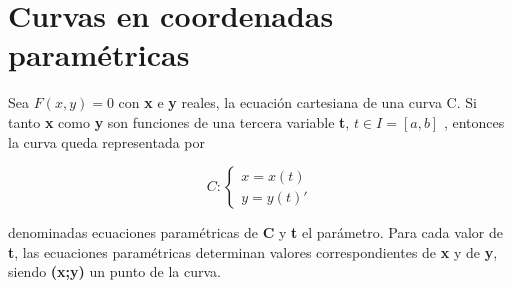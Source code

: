 \section{Curvas en coordenadas paramétricas}
 
Sea $F(x,y)=0$ con \textbf{x} e \textbf{y} reales, la ecuación cartesiana de una curva C. Si tanto \textbf{x} como \textbf{y} son funciones de una tercera variable \textbf{t}, $t \in I=[a,b]$ , entonces la curva queda representada por

$$
C : \left \{ \begin{matrix} x = x(t)
\\ y = y(t)' \end{matrix}\right. 
$$

denominadas ecuaciones paramétricas de \textbf{C} y \textbf{t} el parámetro. Para cada valor de \textbf{t}, las ecuaciones paramétricas determinan valores correspondientes de \textbf{x} y de 
\textbf{y}, siendo \textbf{(x;y)} un punto de la curva.

